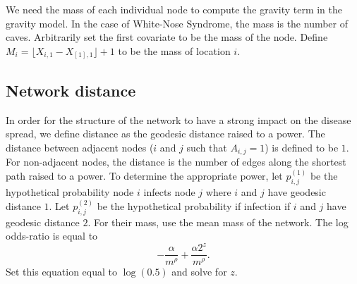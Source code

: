 \documentclass[11pt]{article}
\begin{document}
We need the mass of each individual node to compute the gravity term
in the gravity model.  In the case of White-Nose Syndrome, the mass is
the number of caves.  Arbitrarily set the first covariate to be the
mass of the node.  Define $M_i = \lfloor X_{i,1} - X_{[1],1} \rfloor +
1$ to be the mass of location $i$.


\subsection{Network distance}
\label{sec-2-3}

In order for the structure of the network to have a strong impact on
the disease spread, we define distance as the geodesic distance raised
to a power.  The distance between adjacent nodes ($i$ and $j$ such
that $A_{i,j} = 1$) is defined to be $1$.  For non-adjacent nodes, the
distance is the number of edges along the shortest path raised to a
power.  To determine the appropriate power, let $p^{(1)}_{i,j}$ be the
hypothetical probability node $i$ infects node $j$ where $i$ and $j$
have geodesic distance $1$.  Let $p^{(2)}_{i,j}$ be the hypothetical
probability if infection if $i$ and $j$ have geodesic distance $2$.
For their mass, use the mean mass of the network.  The log odds-ratio
is equal to
\begin{equation*}
  - \frac{\alpha}{m^\rho} + \frac{\alpha2^z}{m^\rho}.
\end{equation*}
Set this equation equal to $\log(0.5)$ and solve for $z$.
\end{document}
